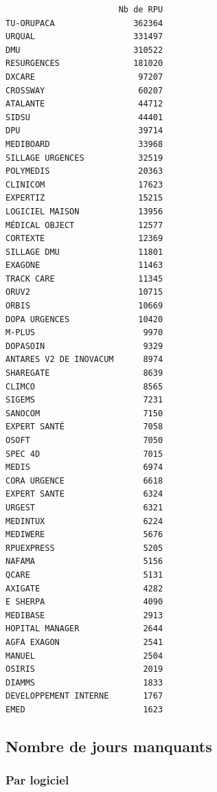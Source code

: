 \documentclass[]{article}
\begin{document}
\begin{verbatim}
                       Nb de RPU
TU-ORUPACA                362364
URQUAL                    331497
DMU                       310522
RESURGENCES               181020
DXCARE                     97207
CROSSWAY                   60207
ATALANTE                   44712
SIDSU                      44401
DPU                        39714
MEDIBOARD                  33968
SILLAGE URGENCES           32519
POLYMEDIS                  20363
CLINICOM                   17623
EXPERTIZ                   15215
LOGICIEL MAISON            13956
MÉDICAL OBJECT             12577
CORTEXTE                   12369
SILLAGE DMU                11801
EXAGONE                    11463
TRACK CARE                 11345
ORUV2                      10715
ORBIS                      10669
DOPA URGENCES              10420
M-PLUS                      9970
DOPASOIN                    9329
ANTARES V2 DE INOVACUM      8974
SHAREGATE                   8639
CLIMCO                      8565
SIGEMS                      7231
SANOCOM                     7150
EXPERT SANTÉ                7058
OSOFT                       7050
SPEC 4D                     7015
MEDIS                       6974
CORA URGENCE                6618
EXPERT SANTE                6324
URGEST                      6321
MEDINTUX                    6224
MEDIWERE                    5676
RPUEXPRESS                  5205
NAFAMA                      5156
QCARE                       5131
AXIGATE                     4282
E SHERPA                    4090
MEDIBASE                    2913
HOPITAL MANAGER             2644
AGFA EXAGON                 2541
MANUEL                      2504
OSIRIS                      2019
DIAMMS                      1833
DEVELOPPEMENT INTERNE       1767
EMED                        1623
\end{verbatim}

\subsection{Nombre de jours manquants}\label{nombre-de-jours-manquants}

\subsubsection{Par logiciel}\label{par-logiciel}
\end{document}
